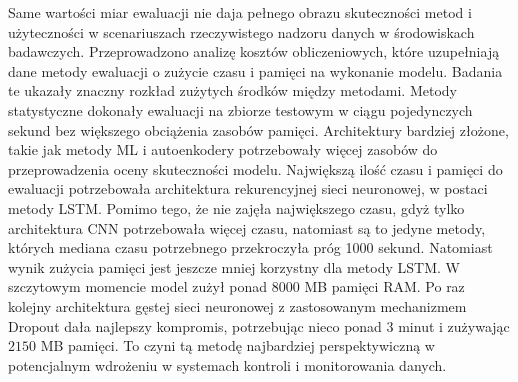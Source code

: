 \documentclass[a4paper,twoside,12pt]{book}
\begin{document}
	Same wartości miar ewaluacji nie daja pełnego obrazu skuteczności metod i użyteczności w scenariuszach rzeczywistego nadzoru danych w środowiskach badawczych. Przeprowadzono analizę kosztów obliczeniowych, które uzupełniają dane metody ewaluacji o zużycie czasu i pamięci na wykonanie modelu. Badania te ukazały znaczny rozkład zużytych środków między metodami. Metody statystyczne dokonały ewaluacji na zbiorze testowym w ciągu pojedynczych sekund bez większego obciążenia zasobów pamięci. Architektury bardziej złożone, takie jak metody ML i autoenkodery potrzebowały więcej zasobów do przeprowadzenia oceny skuteczności modelu. Największą ilość czasu i pamięci do ewaluacji potrzebowała architektura rekurencyjnej sieci neuronowej, w postaci metody LSTM.   Pomimo tego, że nie zajęła największego czasu, gdyż tylko architektura CNN potrzebowała więcej czasu, natomiast są to jedyne metody, których mediana czasu potrzebnego przekroczyła próg 1000 sekund. Natomiast wynik zużycia pamięci jest jeszcze mniej korzystny dla metody LSTM. W szczytowym momencie model zużył ponad $8000$ MB pamięci RAM. Po raz kolejny architektura gęstej sieci neuronowej z zastosowanym mechanizmem Dropout dała najlepszy kompromis, potrzebując nieco ponad 3 minut i zużywając $2150$ MB pamięci. To czyni tą metodę najbardziej perspektywiczną w potencjalnym wdrożeniu w systemach kontroli i monitorowania danych. 
	
\end{document}
